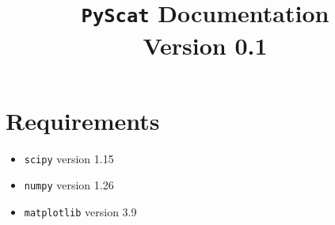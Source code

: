 \documentclass[11pt]{article}
\title{\texttt{PyScat} Documentation \\ \large Version 0.1}
\author{}
\date{}
\begin{document}
\maketitle
\tableofcontents
\newpage

\section{Requirements}
\begin{itemize}
    \item \texttt{scipy} version 1.15
    \item \texttt{numpy} version 1.26
    \item \texttt{matplotlib} version 3.9
\end{itemize}

\newpage



\newpage


\newpage

\newpage

\newpage

\newpage

\newpage

\newpage
\medskip
\printbibliography
\end{document}
